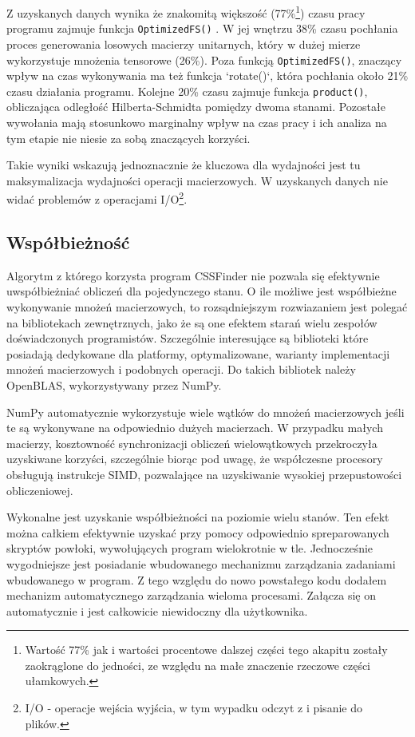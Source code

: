\documentclass[12pt, a4paper]{article}
\newcommand{\code}[1]{\texttt{#1}}
\begin{document}
\begin{sloppypar}
    Z uzyskanych danych wynika że znakomitą większość (77\%\footnote{Wartość 77\% jak i
    wartości procentowe dalszej części tego akapitu zostały zaokrąglone do jedności, ze względu
    na małe znaczenie rzeczowe części ułamkowych.}) czasu pracy programu zajmuje funkcja
    \code{OptimizedFS()} . W jej wnętrzu 38\% czasu pochłania proces generowania
    losowych macierzy unitarnych, który w dużej mierze wykorzystuje mnożenia tensorowe (26\%).
    Poza funkcją \code{OptimizedFS()}, znaczący wpływ na czas wykonywania ma też funkcja
    `rotate()`, która pochłania około 21\% czasu działania programu. Kolejne 20\% czasu zajmuje
    funkcja \code{product()}, obliczająca odległość Hilberta-Schmidta pomiędzy dwoma stanami.
    Pozostałe wywołania mają stosunkowo marginalny wpływ na czas pracy i ich analiza na
    tym etapie nie niesie za sobą znaczących korzyści.

    Takie wyniki wskazują jednoznacznie że kluczowa dla wydajności jest tu
    maksymalizacja wydajności operacji macierzowych. W uzyskanych danych nie widać problemów
    z operacjami I/O\footnote{I/O - operacje wejścia wyjścia, w tym wypadku odczyt z i pisanie
    do plików.}.

    \subsection{Współbieżność}


    Algorytm z którego korzysta program CSSFinder nie pozwala się efektywnie uwspółbieżniać
    obliczeń dla pojedynczego stanu. O ile możliwe jest współbieżne wykonywanie mnożeń
    macierzowych, to rozsądniejszym rozwiazaniem jest polegać na bibliotekach zewnętrznych,
    jako że są one efektem starań wielu zespołów doświadczonych programistów. Szczególnie
    interesujące są biblioteki które posiadają dedykowane dla platformy, optymalizowane,
    warianty implementacji mnożeń macierzowych i podobnych operacji. Do takich bibliotek
    należy OpenBLAS, wykorzystywany przez NumPy.

    NumPy automatycznie wykorzystuje wiele wątków do mnożeń macierzowych jeśli te są wykonywane
    na odpowiednio dużych macierzach. W przypadku małych macierzy, kosztowność synchronizacji
    obliczeń wielowątkowych przekroczyła uzyskiwane korzyści, szczególnie biorąc pod
    uwagę, że współczesne procesory obsługują instrukcje SIMD, pozwalające na
    uzyskiwanie wysokiej przepustowości obliczeniowej.

    Wykonalne jest uzyskanie współbieżności na poziomie wielu stanów. Ten efekt można całkiem
    efektywnie uzyskać przy pomocy odpowiednio spreparowanych skryptów powłoki,
    wywołujących program wielokrotnie w tle. Jednocześnie wygodniejsze jest posiadanie wbudowanego
    mechanizmu zarządzania zadaniami wbudowanego w program. Z tego względu do nowo
    powstałego kodu dodałem mechanizm automatycznego zarządzania wieloma procesami. Załącza
    się on automatycznie i jest całkowicie niewidoczny dla użytkownika.


\end{sloppypar}
\end{document}
